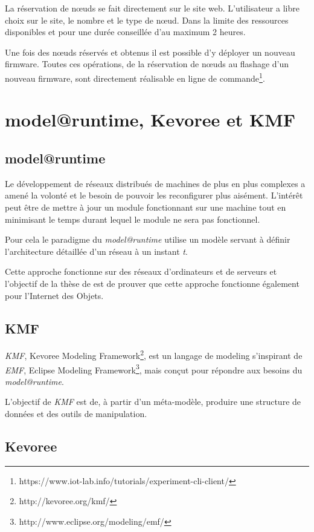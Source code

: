 La réservation de nœuds se fait directement sur le site web. L'utilisateur a libre choix sur le site, le nombre et le type de nœud. Dans la limite des ressources disponibles et pour une durée conseillée d'au maximum 2 heures.

Une fois des nœuds réservés et obtenus il est possible d'y déployer un nouveau firmware. Toutes ces opérations, de la réservation de nœuds au flashage d'un nouveau firmware, sont directement réalisable en ligne de commande\footnote{https://www.iot-lab.info/tutorials/experiment-cli-client/}.

\section{model@runtime, Kevoree et KMF}

\subsection{model@runtime}

Le développement de réseaux distribués de machines de plus en plus complexes a amené la volonté et le besoin de pouvoir les reconfigurer plus aisément. L'intérêt peut être de mettre à jour un module fonctionnant sur une machine tout en minimisant le temps durant lequel le module ne sera pas fonctionnel.

Pour cela le paradigme du \emph{model@runtime} utilise un modèle servant à définir l'architecture détaillée d'un réseau à un instant \emph{t}.

Cette approche fonctionne sur des réseaux d'ordinateurs et de serveurs \cite{fouquet} et l'objectif de la thèse de \paco est de prouver que cette approche fonctionne également pour l'Internet des Objets.

\subsection{KMF}

\emph{KMF}, Kevoree Modeling Framework\footnote{http://kevoree.org/kmf/}, est un langage de modeling s'inspirant de \emph{EMF}, Eclipse Modeling Framework\footnote{http://www.eclipse.org/modeling/emf/}, mais conçut pour répondre aux besoins du \emph{model@runtime}.

L'objectif de \emph{KMF} est de, à partir d'un méta-modèle, produire une structure de données et des outils de manipulation.

\subsection{\label{kevoree}Kevoree}

